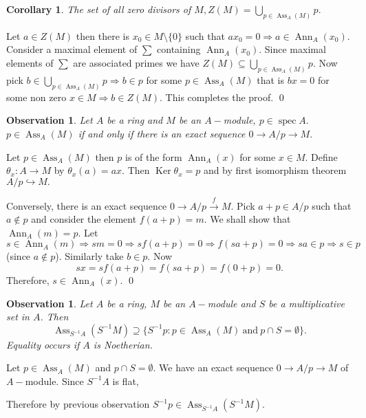 \documentclass[11pt]{amsart}
\newtheorem{obs}[theorem]{Observation}
\newtheorem{corollary}[theorem]{Corollary}%
\newcommand\isom{\mathrel{\stackon[-0.1ex]{\makebox*{\scalebox{1.08}{\AC}}{=\hfill\llap{=}}}{{\AC}}}}
\newcommand\nvisom{\rotatebox[origin=cc] {-90}{$ \isom $}}
\DeclareMathOperator{\ann}{\text{Ann}}
\DeclareMathOperator{\ass}{\text{Ass}}
\DeclareMathOperator{\Ker}{\text{Ker}}
\DeclareMathOperator{\spec}{\text{spec}}
\begin{document}
\begin{corollary}

The set of all zero divisors of $M,Z(M)=\displaystyle\bigcup_{p\in \ass_A(M)}p.$

\end{corollary}

\proof Let $a\in Z(M)$ then there is $x_0\in M\setminus\{0\}$ such that $ax_0=0 \Rightarrow a\in \ann_A(x_0).$ Consider a maximal element of $\displaystyle\sum$ containing $\ann_A(x_0).$ Since maximal elements of $\displaystyle\sum$ are associated primes we have $Z(M)\subseteq \displaystyle\bigcup_{p\in \ass_A(M)}p.$ Now pick $b\in \displaystyle\bigcup_{p\in \ass_A(M)}p \Rightarrow b\in p$ for some $p\in \ass_A(M)$ that is $bx=0$ for some non zero $x\in M \Rightarrow b\in Z(M).$ This completes the proof. \qed


\begin{obs}

Let $A$ be a ring and $M$ be an $A-$module, $p\in\spec A.$ $p\in \ass_A(M)$ if and only if there is an exact sequence $0\to A/p\to M.$

\end{obs}

\proof Let $p\in\ass_A(M)$ then $p$ is of the form $\ann_A(x)$ for some $x\in M.$ Define $\theta_x:A\to M$ by $\theta_x(a)=ax.$ Then $\Ker\theta_x=p$ and by first isomorphism theorem $A/p\hookrightarrow M.$ 

 Conversely, there is an exact sequence $0\to A/p\xrightarrow{f} M.$ Pick $a+p\in A/p$ such that $a\notin p$ and consider the element $f(a+p)=m$. We shall show that $\ann_A(m)=p.$ Let $s\in \ann_A(m) \Rightarrow sm=0 \Rightarrow  sf(a+p)=0 \Rightarrow f(sa+p)= 0 \Rightarrow sa\in p \Rightarrow s\in p$ (since $a\notin p$). Similarly take $b\in p.$ Now $$sx=sf(a+p)=f(sa+p)=f(0+p)=0.$$ Therefore, $s\in\ann_A(x).$ \qed


\begin{obs}

Let $A$ be a ring, $M$ be an $A-$module and $S$ be a multiplicative set in $A$. Then $$\ass_{S^{-1}A}(S^{-1}M)\supseteq \{S^{-1}p:p\in\ass_A(M)~\text{and}~p\cap S=\emptyset\}.$$ Equality occurs if $A$ is Noetherian.

\end{obs}

\proof Let $p\in \ass_A(M)$ and $p\cap S=\emptyset.$ We have an exact sequence $0\to A/p\to M$ of $A-$module. Since $S^{-1}A$ is flat, 

\begin{center}


\end{center}
Therefore by previous observation $S^{-1}p\in \ass_{S^{-1}A}(S^{-1}M).$
\end{document}
